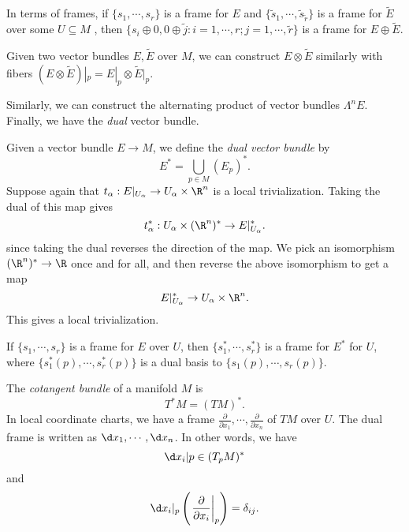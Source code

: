 \documentclass[a4paper]{article}
\begin{document}
In terms of frames, if $\{s_1, \cdots, s_r\}$ is a frame for $E$ and $\{\tilde{s}_1, \cdots, \tilde{s}_{\tilde{r}}\}$ is a frame for $\tilde{E}$ over some $U\subseteq M$ , then $\{s_i \oplus 0, 0 \oplus \tilde{j}: i = 1, \cdots, r; j = 1, \cdots, \tilde{r}\}$ is a frame for $E \oplus \tilde{E}$.

\begin{defi}
  Given two vector bundles $E, \tilde{E}$ over $M$, we can construct $E \otimes \tilde{E}$ similarly with fibers $(E \otimes \tilde{E})|_p = E|_p \otimes \tilde{E}|_p$.
\end{defi}

Similarly, we can construct the alternating product of vector bundles $\Lambda^n E$. Finally, we have the \emph{dual} vector bundle.

\begin{defi}
  Given a vector bundle $E \to M$, we define the \emph{dual vector bundle} by
  \[
    E^* = \bigcup_{p \in M} (E_p)^*.
  \]
  Suppose again that $t_\alpha: E|_{U_\alpha} \to U_\alpha \times \R^n$ is a local trivialization. Taking the dual of this map gives
  \[
    t_\alpha^*: U_\alpha \times (\R^n)^* \to E|_{U_\alpha}^*.
  \]
  since taking the dual reverses the direction of the map. We pick an isomorphism $(\R^n)^* \to \R$ once and for all, and then reverse the above isomorphism to get a map
  \[
    E|_{U_\alpha}^* \to U_\alpha \times \R^n.
  \]
  This gives a local trivialization.
\end{defi}

If $\{s_1, \cdots, s_r\}$ is a frame for $E$ over $U$, then $\{s_1^*, \cdots, s_r^*\}$ is a frame for $E^*$ for $U$, where $\{s_1^{*}(p), \cdots, s_r^*(p)\}$ is a dual basis to $\{s_1(p), \cdots, s_r(p)\}$.

\begin{defi}
  The \emph{cotangent bundle} of a manifold $M$ is
  \[
    T^*M = (TM)^*.
  \]
  In local coordinate charts, we have a frame $\frac{\partial}{\partial x_1}, \cdots, \frac{\partial}{\partial x_n}$ of $TM$ over $U$. The dual frame is written as $\d x_1, \cdots, \d x_n$. In other words, we have
  \[
    \d x_i|p \in (T_p M)^*
  \]
  and
  \[
    \d x_i|_p\left(\left.\frac{\partial}{\partial x_i}\right|_p\right) = \delta_{ij}.
  \]
\end{defi}
\end{document}
